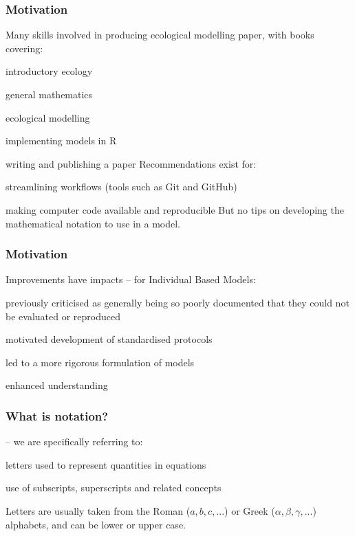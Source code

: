 
\begin{frame}
\frametitle{Motivation}
Many skills involved in producing ecological modelling paper, with books covering:
\bi
\item introductory ecology
\item general mathematics
\item ecological modelling
\item implementing models in R
\item writing and publishing a paper
\ei
  Recommendations exist for:
\bi
\item streamlining workflows (tools such as Git and GitHub)
\item making computer code available and reproducible
\ei
But no tips on developing the mathematical notation to use in a model.

\end{frame}


\begin{frame}
\frametitle{Motivation}

Improvements have impacts -- for Individual Based Models:

\bi
\item previously criticised as generally being so poorly documented
that they could not be evaluated or reproduced
\item motivated development of standardised protocols
\item led to a more rigorous formulation of models
\item enhanced understanding
\ei
\end{frame}


\begin{frame}
\frametitle{What is notation?}

 -- we are specifically referring to:
\bi
\item letters used to represent quantities in equations
\item use of subscripts, superscripts and related concepts
\ei

Letters are usually taken from the Roman ($a, b, c, ...$) or
Greek ($\alpha, \beta, \gamma, ...$) alphabets, and can be lower or upper case.
\end{frame}

